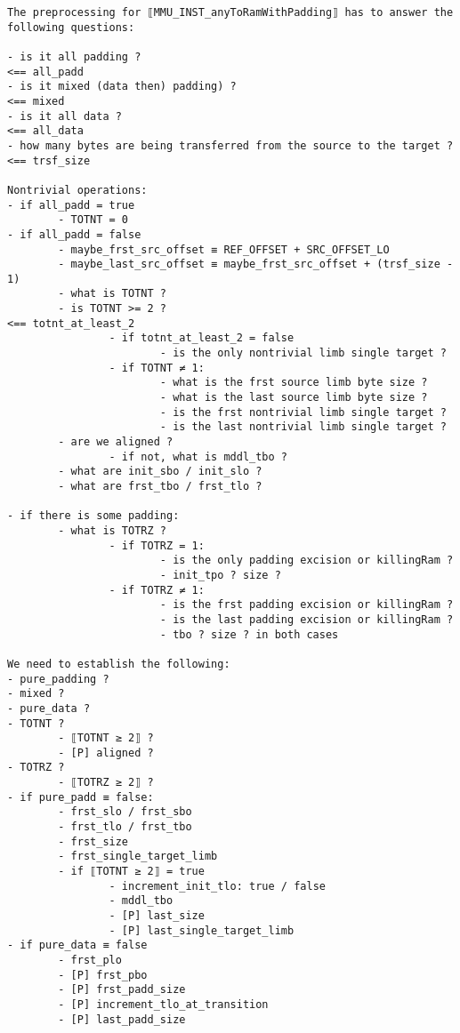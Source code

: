 \documentclass[varwidth=\maxdimen,margin=0.5cm,multi={verbatim}]{standalone}
\begin{document}
\begin{verbatim}
The preprocessing for ⟦MMU_INST_anyToRamWithPadding⟧ has to answer the following questions:

- is it all padding ?                                                        <== all_padd
- is it mixed (data then) padding) ?                                         <== mixed
- is it all data ?                                                           <== all_data
- how many bytes are being transferred from the source to the target ?       <== trsf_size

Nontrivial operations:
- if all_padd = true
        - TOTNT = 0
- if all_padd = false
        - maybe_frst_src_offset ≡ REF_OFFSET + SRC_OFFSET_LO
        - maybe_last_src_offset ≡ maybe_frst_src_offset + (trsf_size - 1)
        - what is TOTNT ?
        - is TOTNT >= 2 ?                                                    <== totnt_at_least_2
                - if totnt_at_least_2 = false
                        - is the only nontrivial limb single target ?
                - if TOTNT ≠ 1:
                        - what is the frst source limb byte size ?
                        - what is the last source limb byte size ?
                        - is the frst nontrivial limb single target ?
                        - is the last nontrivial limb single target ?
        - are we aligned ?
                - if not, what is mddl_tbo ?
        - what are init_sbo / init_slo ?
        - what are frst_tbo / frst_tlo ?

- if there is some padding:
        - what is TOTRZ ?
                - if TOTRZ = 1:
                        - is the only padding excision or killingRam ?
                        - init_tpo ? size ?
                - if TOTRZ ≠ 1:
                        - is the frst padding excision or killingRam ?
                        - is the last padding excision or killingRam ?
                        - tbo ? size ? in both cases

We need to establish the following:
- pure_padding ?
- mixed ?
- pure_data ?
- TOTNT ?
        - ⟦TOTNT ≥ 2⟧ ?
        - [P] aligned ?
- TOTRZ ?
        - ⟦TOTRZ ≥ 2⟧ ?
- if pure_padd ≡ false:
        - frst_slo / frst_sbo
        - frst_tlo / frst_tbo
        - frst_size
        - frst_single_target_limb
        - if ⟦TOTNT ≥ 2⟧ = true
                - increment_init_tlo: true / false
                - mddl_tbo
                - [P] last_size
                - [P] last_single_target_limb
- if pure_data ≡ false
        - frst_plo
        - [P] frst_pbo
        - [P] frst_padd_size
        - [P] increment_tlo_at_transition
        - [P] last_padd_size



\end{verbatim}
\end{document}
